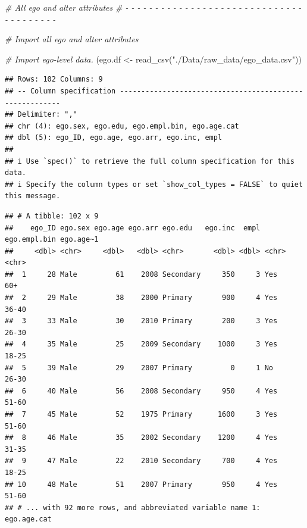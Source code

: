 \documentclass[
]{book}
\newenvironment{Shaded}{\begin{snugshade}}{\end{snugshade}}
\newcommand{\CommentTok}[1]{\textcolor[rgb]{0.56,0.35,0.01}{\textit{#1}}}
\newcommand{\FunctionTok}[1]{\textcolor[rgb]{0.00,0.00,0.00}{#1}}
\newcommand{\NormalTok}[1]{#1}
\newcommand{\OtherTok}[1]{\textcolor[rgb]{0.56,0.35,0.01}{#1}}
\newcommand{\StringTok}[1]{\textcolor[rgb]{0.31,0.60,0.02}{#1}}
\begin{document}
\begin{Shaded}
\begin{Highlighting}[]
\CommentTok{\# All ego and alter attributes}
\CommentTok{\# {-} {-} {-} {-} {-} {-} {-} {-} {-} {-} {-} {-} {-} {-} {-} {-} {-} {-} {-} {-} {-} {-} {-} {-} {-} {-} {-} {-} {-} {-} {-} {-} {-} {-} {-} {-} {-} {-} {-} }

\CommentTok{\# Import all ego and alter attributes}

\CommentTok{\# Import ego{-}level data.}
\NormalTok{(ego.df }\OtherTok{\textless{}{-}} \FunctionTok{read\_csv}\NormalTok{(}\StringTok{"./Data/raw\_data/ego\_data.csv"}\NormalTok{))}
\end{Highlighting}
\end{Shaded}

\begin{verbatim}
## Rows: 102 Columns: 9
## -- Column specification --------------------------------------------------------
## Delimiter: ","
## chr (4): ego.sex, ego.edu, ego.empl.bin, ego.age.cat
## dbl (5): ego_ID, ego.age, ego.arr, ego.inc, empl
## 
## i Use `spec()` to retrieve the full column specification for this data.
## i Specify the column types or set `show_col_types = FALSE` to quiet this message.
\end{verbatim}

\begin{verbatim}
## # A tibble: 102 x 9
##    ego_ID ego.sex ego.age ego.arr ego.edu   ego.inc  empl ego.empl.bin ego.age~1
##     <dbl> <chr>     <dbl>   <dbl> <chr>       <dbl> <dbl> <chr>        <chr>    
##  1     28 Male         61    2008 Secondary     350     3 Yes          60+      
##  2     29 Male         38    2000 Primary       900     4 Yes          36-40    
##  3     33 Male         30    2010 Primary       200     3 Yes          26-30    
##  4     35 Male         25    2009 Secondary    1000     3 Yes          18-25    
##  5     39 Male         29    2007 Primary         0     1 No           26-30    
##  6     40 Male         56    2008 Secondary     950     4 Yes          51-60    
##  7     45 Male         52    1975 Primary      1600     3 Yes          51-60    
##  8     46 Male         35    2002 Secondary    1200     4 Yes          31-35    
##  9     47 Male         22    2010 Secondary     700     4 Yes          18-25    
## 10     48 Male         51    2007 Primary       950     4 Yes          51-60    
## # ... with 92 more rows, and abbreviated variable name 1: ego.age.cat
\end{verbatim}
\end{document}
